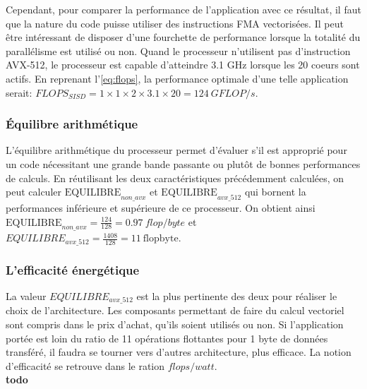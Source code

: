 Cependant, pour comparer la performance de l'application avec ce résultat, il faut que la nature du code puisse utiliser des instructions FMA vectorisées. Il peut être intéressant de disposer d'une fourchette de performance lorsque la totalité du parallélisme est utilisé ou non. Quand le processeur n'utilisent pas d'instruction AVX-512, le processeur est capable d'atteindre 3.1 GHz lorsque les 20 coeurs sont actifs. En reprenant l'\autoref{eq:flops}, la performance optimale d'une telle application serait: $FLOPS_{SISD} = 1 \times 1 \times 2 \times 3.1 \times 20 = 124 \ GFLOP/s$.

\subsubsection{Équilibre arithmétique}
L'équilibre arithmétique du processeur permet d'évaluer s'il est approprié pour un code nécessitant une grande bande passante ou plutôt de bonnes performances de calculs. En réutilisant les deux caractéristiques précédemment calculées, on peut calculer $\text{EQUILIBRE}_{non\_avx}$ et $\text{EQUILIBRE}_{avx\_512}$ qui bornent la performances inférieure et supérieure de ce processeur. On obtient ainsi $\text{EQUILIBRE}_{non\_avx} = \frac{124}{128} = 0.97\ flop/byte$ et $EQUILIBRE_{avx\_512} = \frac{1408}{128} = 11\ \text{flopbyte}$. 
 

\subsubsection{L'efficacité énergétique}

La valeur  $EQUILIBRE_{avx\_512}$ est la plus pertinente des deux pour réaliser le choix de l'architecture. Les composants permettant de faire du calcul vectoriel sont compris dans le prix d'achat, qu'ils soient utilisés ou non. Si l'application portée est loin du ratio de 11 opérations flottantes pour 1 byte de données transféré, il faudra se tourner vers d'autres architecture, plus efficace. La notion d'efficacité se retrouve dans le ration $flops/watt$.
\\
\textbf{todo}















